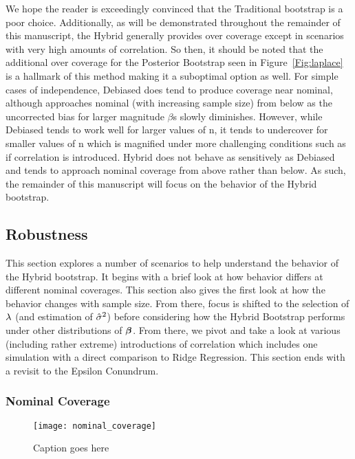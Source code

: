 We hope the reader is exceedingly convinced that the Traditional bootstrap is a poor choice. Additionally, as will be demonstrated throughout the remainder of this manuscript, the Hybrid generally provides over coverage except in scenarios with very high amounts of correlation.  So then, it should be noted that the additional over coverage for the Posterior Bootstrap seen in Figure~\ref{Fig:laplace} is a hallmark of this method making it a suboptimal option as well. For simple cases of independence, Debiased does tend to produce coverage near nominal, although approaches nominal (with increasing sample size) from below as the uncorrected bias for larger magnitude $\beta$s slowly diminishes. However, while Debiased tends to work well for larger values of n, it tends to undercover for smaller values of n which is magnified under more challenging conditions such as if correlation is introduced. Hybrid does not behave as sensitively as Debiased and tends to approach nominal coverage from above rather than below. As such, the remainder of this manuscript will focus on the behavior of the Hybrid bootstrap.

\subsection{Robustness}

This section explores a number of scenarios to help understand the behavior of the Hybrid bootstrap. It begins with a brief look at how behavior differs at different nominal coverages. This section also gives the first look at how the behavior changes with sample size. From there, focus is shifted to the selection of $\lambda$ (and estimation of $\hat{\sigma}^2$) before considering how the Hybrid Bootstrap performs under other distributions of $\boldsymbol{\beta}$. From there, we pivot and take a look at various (including rather extreme) introductions of correlation which includes one simulation with a direct comparison to Ridge Regression. This section ends with a revisit to the Epsilon Conundrum.

\subsubsection{Nominal Coverage}

\begin{figure}
  \texttt{[image: nominal\_coverage]}
  \caption{\label{Fig:nominal_coverage} Caption goes here}
\end{figure}

